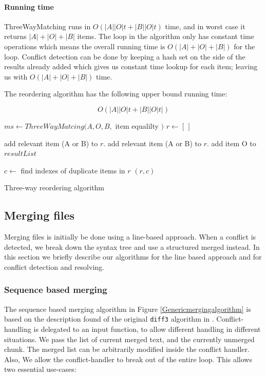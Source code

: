 \documentclass[11pt]{article}
\begin{document}
\paragraph{Running time} ThreeWayMatching runs in $O(|A||O| t + |B||O| t)$ time, and in worst case it returns $|A|+|O|+|B|$ items. The loop in the algorithm only has constant time operations which means the overall running time is $O(|A|+|O|+|B|)$ for the loop. Conflict detection can be done by keeping a hash set on the side of the results already added which gives us constant time lookup for each item; leaving us with $O(|A|+|O|+|B|)$ time.

The reordering algorithm has the following upper bound running time:

\begin{equation}
O(|A||O| t + |B||O| t| ) \nonumber
\end{equation}

\begin{algorithm}
\begin{algorithmic}
   \State $ms \gets ThreeWayMatcing(A, O, B, $ item equalilty $)$
   \State $r \gets [\,]$
   
         \State add relevant item (A or B) to $r$.
      \EndIf
         \State add relevant item (A or B) to $r$.
      \EndIf
         \State add item O to $resultList$
      \EndIf
      
	\EndFor
	\State $c \gets$ find indexes of duplicate items in $r$
	\State \Return $(r, c)$
\EndFunction
\end{algorithmic}
\caption{Three-way reordering algorithm}
  \label{ThreeWayReorderingAlgorithm}
\end{algorithm}

\subsection{Merging files}

\label{MergingFiles}

Merging files is initially be done using a line-based approach. When a conflict is detected, we break down the syntax tree and use a structured merged instead. In this section we briefly describe our algorithms for the line based approach and for conflict detection and resolving.

\subsubsection{Sequence based merging}
The sequence based merging algorithm in Figure \ref{Genericmergingalgorithm} is based on the description found of the original \texttt{diff3} algorithm in \citet{Khanna}. Conflict-handling is delegated to an input function, to allow different handling in different situations. We pass the list of current merged text, and the currently unmerged chunk. The merged list can be arbitrarily modified inside the conflict handler. Also, We allow the conflict-handler to break out of the entire loop. This allows two essential use-cases:
\end{document}
